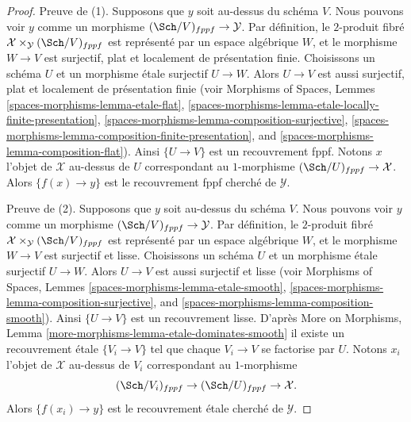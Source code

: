 \begin{proof}
Preuve de (1). Supposons que $y$ soit au-dessus du schéma $V$.
Nous pouvons voir $y$ comme un morphisme $(\Sch/V)_{fppf} \to \mathcal{Y}$.
Par définition, le $2$-produit fibré
$\mathcal{X} \times_\mathcal{Y} (\Sch/V)_{fppf}$
est représenté par un espace algébrique $W$, et le morphisme
$W \to V$ est surjectif, plat et localement de présentation finie.
Choisissons un schéma $U$ et un morphisme étale surjectif $U \to W$.
Alors $U \to V$ est aussi surjectif, plat et localement de présentation finie
(voir Morphisms of Spaces, Lemmes
\ref{spaces-morphisms-lemma-etale-flat},
\ref{spaces-morphisms-lemma-etale-locally-finite-presentation},
\ref{spaces-morphisms-lemma-composition-surjective},
\ref{spaces-morphisms-lemma-composition-finite-presentation}, and
\ref{spaces-morphisms-lemma-composition-flat}).
Ainsi $\{U \to V\}$ est un recouvrement fppf. Notons $x$ l'objet de
$\mathcal{X}$ au-dessus de $U$ correspondant au $1$-morphisme
$(\Sch/U)_{fppf} \to \mathcal{X}$. Alors $\{f(x) \to y\}$ est
le recouvrement fppf cherché de $\mathcal{Y}$.

\medskip\noindent
Preuve de (2). Supposons que $y$ soit au-dessus du schéma $V$.
Nous pouvons voir $y$ comme un morphisme $(\Sch/V)_{fppf} \to \mathcal{Y}$.
Par définition, le $2$-produit fibré
$\mathcal{X} \times_\mathcal{Y} (\Sch/V)_{fppf}$
est représenté par un espace algébrique $W$, et le morphisme
$W \to V$ est surjectif et lisse.
Choisissons un schéma $U$ et un morphisme étale surjectif $U \to W$.
Alors $U \to V$ est aussi surjectif et lisse
(voir Morphisms of Spaces, Lemmes
\ref{spaces-morphisms-lemma-etale-smooth},
\ref{spaces-morphisms-lemma-composition-surjective}, and
\ref{spaces-morphisms-lemma-composition-smooth}).
Ainsi $\{U \to V\}$ est un recouvrement lisse. D'après
More on Morphisms, Lemma \ref{more-morphisms-lemma-etale-dominates-smooth}
il existe un recouvrement étale $\{V_i \to V\}$ tel que
chaque $V_i \to V$ se factorise par $U$. Notons $x_i$ l'objet de
$\mathcal{X}$ au-dessus de $V_i$ correspondant au $1$-morphisme
$$
(\Sch/V_i)_{fppf} \to (\Sch/U)_{fppf} \to \mathcal{X}.
$$
Alors $\{f(x_i) \to y\}$ est
le recouvrement étale cherché de $\mathcal{Y}$.
\end{proof}

